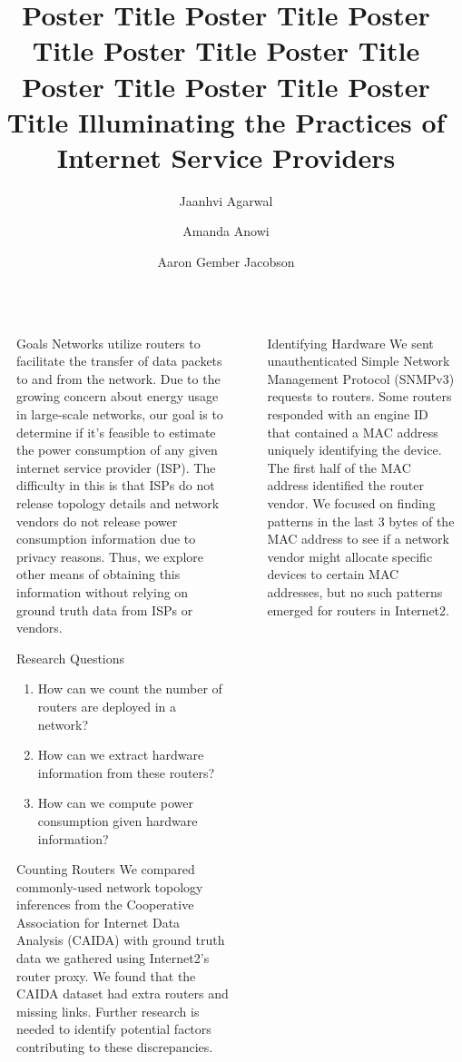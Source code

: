 \documentclass[final]{beamer}
\title{Poster Title  Poster Title Poster Title Poster Title Poster Title Poster Title Poster Title Poster Title}
\title{ Illuminating the Practices of Internet Service Providers
}
\author{Jaanhvi Agarwal \and Amanda Anowi \and  Aaron Gember Jacobson}
\institute[shortinst]{Department of Computer Science, Colgate University}
\newlength{\sepwidth}
\newlength{\colwidth}
\newcommand{\separatorcolumn}{\begin{column}{\sepwidth}\end{column}}
\begin{document}
\fontsize{33pt}{50pt}\selectfont

\begin{frame}[t]
\begin{columns}[t]
\separatorcolumn

\begin{column}{\colwidth}

\begin{block}{Goals}
Networks utilize routers to facilitate the transfer of data packets to and from the network. Due to the growing concern about energy usage in large-scale networks, our goal is to determine if it's feasible to estimate the power consumption of any given internet service provider (ISP). The difficulty in this is that ISPs do not release topology details and network vendors do not release power consumption information due to privacy reasons. Thus, we explore other means of obtaining this information without relying on ground truth data from ISPs or vendors.
\end{block}

  
\begin{exampleblock}{Research Questions}
\begin{enumerate}
    \item How can we count the number of routers are deployed in a network?
    \item How can we extract hardware information from these routers?
    \item How can we compute power consumption given hardware information?
\end{enumerate}
\end{exampleblock}

\begin{block}{Counting Routers}
We compared commonly-used network topology inferences from the Cooperative Association for Internet Data Analysis (CAIDA) with ground truth data we gathered using Internet2's router proxy. We found that the CAIDA dataset had extra routers and missing links. Further research is needed to identify potential factors contributing to these discrepancies.





\end{block}

\end{column}

\separatorcolumn
\begin{column}{\colwidth}

\begin{block}{Identifying Hardware}
We sent unauthenticated Simple Network Management Protocol (SNMPv3) requests to routers. Some routers responded with an engine ID that contained a MAC address uniquely identifying the device. The first half of the MAC address identified the router vendor. We focused on finding patterns in the last 3 bytes of the MAC address to see if a network vendor might allocate specific devices to certain MAC addresses, but no such patterns emerged for routers in Internet2.


\end{block}
\end{column}
\end{columns}
\end{frame}
\end{document}
